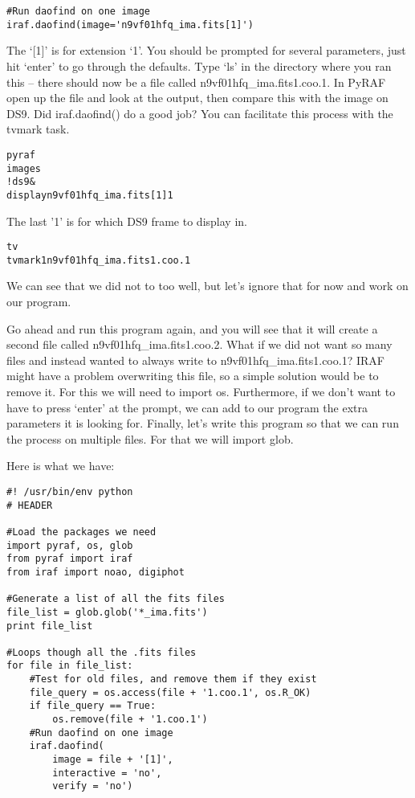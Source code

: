 \begin{verbatim}
#Run daofind on one image  
iraf.daofind(image='n9vf01hfq_ima.fits[1]')  
\end{verbatim}

The `[1]' is for extension `1'.  You should be prompted for several
parameters, just hit `enter' to go through the defaults.  Type `ls' in
the directory where you ran this -- there should now be a file called
n9vf01hfq\_ima.fits1.coo.1. In PyRAF open up the file and look at the
output, then compare this with the image on DS9.  Did {\sf\small
  iraf.daofind()} do a good job?  You can facilitate this process with
the {\sf\small tvmark} task.

\begin{alltt}
\termtab pyraf  
\pyraftab images 
\pyraftab !ds9 & 
\pyraftab display n9vf01hfq_ima.fits[1] 1
\end{alltt}

The last '1' is for which DS9 frame to display in.

\begin{alltt}
\pyraftab tv  
\pyraftab tvmark 1 n9vf01hfq_ima.fits1.coo.1
\end{alltt}

We can see that we did not to too well, but let's ignore that for now
and work on our program.

Go ahead and run this program again, and you will see that it will
create a second file called n9vf01hfq\_ima.fits1.coo.2. What if we did
not want so many files and instead wanted to always write to
n9vf01hfq\_ima.fits1.coo.1?  IRAF might have a problem overwriting
this file, so a simple solution would be to remove it.  For this we
will need to import {\sf\small os}.  Furthermore, if we don't want to
have to press `enter' at the prompt, we can add to our program the
extra parameters it is looking for.  Finally, let's write this program
so that we can run the process on multiple files.  For that we will
import {\sf\small glob}.

Here is what we have:

\begin{verbatim}
#! /usr/bin/env python
# HEADER

#Load the packages we need 
import pyraf, os, glob  
from pyraf import iraf
from iraf import noao, digiphot
  
#Generate a list of all the fits files
file_list = glob.glob('*_ima.fits') 
print file_list 

#Loops though all the .fits files 
for file in file_list: 
    #Test for old files, and remove them if they exist
    file_query = os.access(file + '1.coo.1', os.R_OK)  
    if file_query == True: 
        os.remove(file + '1.coo.1')  
    #Run daofind on one image  
    iraf.daofind( 
        image = file + '[1]',  
        interactive = 'no',  
        verify = 'no')  
\end{verbatim}

